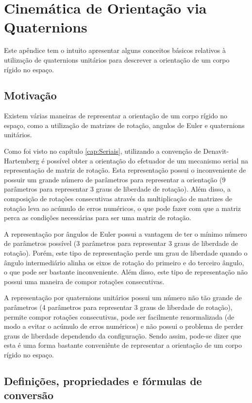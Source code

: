 \documentclass[]{politex}
\begin{document}
\chapter{Cinemática de Orientação via Quaternions} \label{ap:Quat}
Este apêndice tem o intuito apresentar alguns conceitos básicos relativos à utilização de quaternions unitários para descrever a orientação de um corpo rígido no espaço.
\section{Motivação}
Existem várias maneiras de representar a orientação de um corpo rígido no espaço, como a utilização de matrizes de rotação, angulos de Euler e quaternions unitários.

Como foi visto no capítulo \ref{cap:Seriais}, utilizando a convenção de Denavit-Hartemberg é possível obter a orientação do efetuador de um mecanismo serial na representação de matriz de rotação. Esta representação possui o inconveniente de possuir um grande número de parâmetros para representar a orientação (9 parâmetros para representar 3 graus de liberdade de rotação). Além disso, a composição de rotações consecutivas através da multiplicação de matrizes de rotação leva ao acúmulo de erros numéricos, o que pode fazer com que a matriz perca as condições necessárias para ser uma matriz de rotação.

A representação por ângulos de Euler possui a vantagem de ter o mínimo número de parâmetros possível (3 parâmetros para representar 3 graus de liberdade de rotação). Porém, este tipo de representação perde um grau de liberdade quando o ângulo intermediário alinha os eixos de rotação do primeiro e do terceiro ângulo, o que pode ser bastante inconveniente. Além disso, este tipo de representação não possui uma maneira de compor rotações consecutivas.

A representação por quaternions unitários possui um número não tão grande de parâmetros (4 parâmetros para representar 3 graus de liberdade de rotação), permite compor rotações consecutivas, pode ser facilmente renormalizada (de modo a evitar o acúmulo de erros numéricos) e não possui o problema de perder graus de liberdade dependendo da configuração. Sendo assim, pode-se dizer que esta é uma forma bastante conveniênte de representar a orientação de um corpo rígido no espaço.

\section{Definições, propriedades e fórmulas de conversão}
\end{document}
